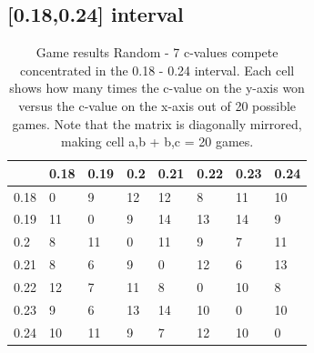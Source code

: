\documentclass[11pt,a4paper]{article}
\begin{document}
\begin{appendices}
\subsection{[0.18,0.24] interval}
\begin{table}[H]
	\centering
	\begin{tabular}{|l|l|l|l|l|l|l|l|}
		\hline
		     & 0.18 & 0.19 & 0.2 & 0.21 & 0.22 & 0.23 & 0.24    \\ \hline
		0.18 & 0    & 9   & 12   & 12   & 8    & 11   & 10 \\ \hline
		0.19 & 11   & 0   & 9    & 14   & 13   & 14   & 9  \\ \hline
		0.2  & 8    & 11  & 0    & 11   & 9    & 7    & 11 \\ \hline
		0.21 & 8    & 6   & 9    & 0    & 12   & 6    & 13 \\ \hline
		0.22 & 12   & 7   & 11   & 8    & 0    & 10   & 8  \\ \hline
		0.23 & 9    & 6   & 13   & 14   & 10   & 0    & 10 \\ \hline
		0.24 & 10   & 11  & 9    & 7    & 12   & 10   & 0  \\ \hline
	\end{tabular}
		\caption{Game results Random - 7 c-values compete concentrated in the 0.18 - 0.24 interval. Each cell shows how many times the c-value on the y-axis won versus the c-value on the x-axis out of 20 possible games. Note that the matrix is diagonally mirrored, making cell a,b + b,c = 20 games.}
		\label{table:ranking-matrix-random-narrow}
\end{table}

\newcommand{\ifequals}[3]{\ifthenelse{\equal{#1}{#2}}{#3}{}}
\newcommand{\case}[2]{#1 #2} %
\newenvironment{switch}[1]{\renewcommand{\case}{\ifequals{#1}}}{}

\newcommand{\PercentRed}[1]{
	\ifnum #1<9
	    1
	\else
	    \ifnum #1 < 12
	        0.9
	    \else
	        0.2
	    \fi
	\fi
}

\newcommand{\PercentGreen}[1]{
	\ifnum #1<9
		0.2
	\else
		\ifnum #1 < 12
		    0.9
		\else
		    1
		\fi
	\fi
}

\newcommand{\PercentBlue}[1]{
	\ifnum #1<9
	    0.2
	\else
		\ifnum #1 < 12
		    0
		\else
			0.2
		\fi
	\fi
}

\newcommand{\ApplyGradient}[1] {
	\IfSubStr{#1}{-}{
		#1
	}{%
	    \IfSubStr{#1}{.}{#1}{
		    \cellcolor[rgb]{\PercentRed{#1},\PercentGreen{#1}, \PercentBlue{#1}}#1
	    }
	}%
}


\end{appendices}
\end{document}
